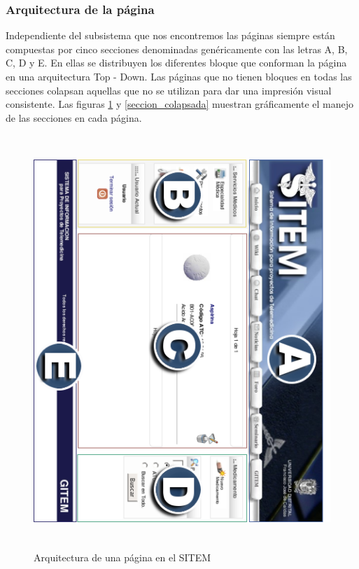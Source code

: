 \subsubsection{Arquitectura de la página}

Independiente del subsistema que nos encontremos las páginas siempre están compuestas por cinco secciones denominadas genéricamente con las letras A, B, C, D y E. En ellas se distribuyen los diferentes bloque que conforman la página en una arquitectura Top - Down. Las páginas que no tienen bloques en todas las secciones colapsan aquellas que no se utilizan para dar una impresión visual consistente. Las figuras \ref{secciones} y \ref{seccion_colapsada} muestran gráficamente el manejo de las secciones en cada página.

\begin{figure}
 \centering
 \includegraphics[width=156mm, height=156mm]{secciones.png}
 \caption{Arquitectura de una página en el SITEM}
 \label{secciones}
\end{figure}

